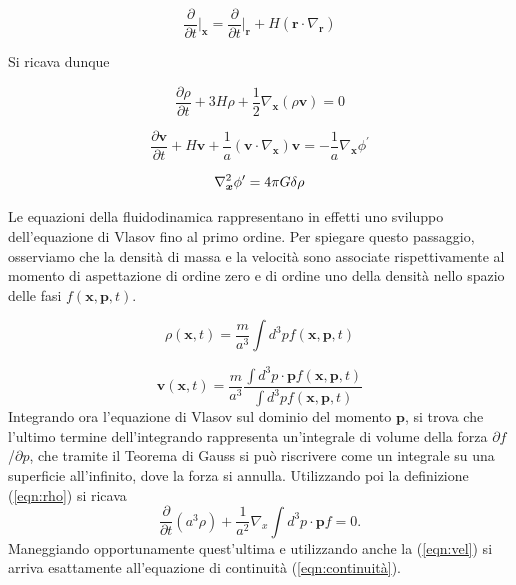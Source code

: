 \begin{equation}
    \frac{\partial}{\partial t}\biggr|_{\bm{x}} = \frac{\partial}{\partial t}\biggr|_{\bm{r}} + H(\bm{r} \cdot \nabla_{\bm{r}})
\end{equation}

Si ricava dunque

\begin{equation}
    \label{eqn:continuitax}
    \frac{\partial\rho}{\partial t} + 3H\rho +\frac{1}{2}\nabla_{\bm{x}}(\rho\bm{v}) = 0
\end{equation}

\begin{equation}
    \label{eqn:eulerox}
    \frac{\partial \bm{v}}{\partial t} + H \bm{v} + \frac{1}{a}(\bm{v}\cdot\nabla_{\bm{x}})\bm{v} = -\frac{1}{a}\nabla_{\bm{x}}\phi^{'}
\end{equation}

\begin{equation}
    \label{eqn:poissonx}
    \laplacian_{\bm{x}}\phi{'} = 4\pi G \delta\rho
\end{equation}

Le equazioni della fluidodinamica rappresentano in effetti uno sviluppo dell'equazione 
di Vlasov fino al primo ordine. Per spiegare questo passaggio, osserviamo che la densità
di massa e la velocità sono associate rispettivamente al momento di aspettazione di ordine 
zero e di ordine uno della densità nello spazio delle fasi $f(\bm{x}, \bm{p}, t)$.

\begin{equation}
    \label{eqn:rho}
    \rho(\bm{x}, t) = \frac{m}{a^3}\int d^3p f(\bm{x}, \bm{p}, t)
\end{equation}

\begin{equation}
    \label{eqn:vel}
    \bm{v}(\bm{x}, t) = \frac{m}{a^3}\frac{\int d^3p \cdot \bm{p}f(\bm{x}, \bm{p}, t)}{\int d^3p f(\bm{x}, \bm{p}, t)}
\end{equation}
Integrando ora l'equazione di Vlasov sul dominio del momento $\bm{p}$, si trova che l'ultimo termine
dell'integrando rappresenta un'integrale di volume della forza $\partial f$/$\partial p$, che tramite
il Teorema di Gauss si può riscrivere come un integrale su una superficie all'infinito, dove la forza
si annulla. Utilizzando poi la definizione (\ref{eqn:rho}) si ricava 
\begin{equation}
    \frac{\partial}{\partial t}(a^3 \rho) + \frac{1}{a^2}\nabla_x \int d^3 p \cdot \bm{p} f = 0.
\end{equation}
Maneggiando opportunamente quest'ultima e utilizzando anche la (\ref{eqn:vel})
si arriva esattamente all'equazione di continuità (\ref{eqn:continuità}).

